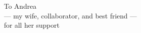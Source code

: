 
\thispagestyle{empty}
\vspace*{3.5cm}
\begin{omtext}
\begin{center}\LARGE
  To Andrea\\
  --- my wife, collaborator, and best friend ---\\
  for all her support
\end{center}
\end{omtext}

